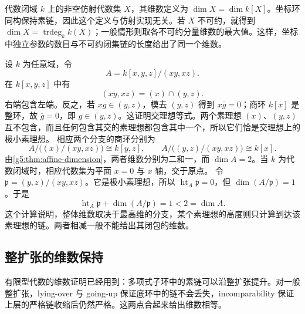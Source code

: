 代数闭域 \(k\) 上的非空仿射代数集 \(X\)，其维数定义为 \(\dim X=\dim k[X]\)。坐标环同构保持素链，因此这个定义与仿射实现无关。若 \(X\) 不可约，就得到 \(\dim X=\operatorname{trdeg}_k k(X)\)；一般情形则取各不可约分量维数的最大值。这样，坐标中独立参数的数目与不可约闭集链的长度给出了同一个维数。

\begin{example}\label{g5:exm:mixed-dimensional-components}
	设 \(k\) 为任意域，令
	\[
	A=k[x,y,z]/(xy,xz).
	\]
	在 \(k[x,y,z]\) 中有
	\[
	(xy,xz)=(x)\cap(y,z).
	\]
	右端包含左端。反之，若 \(xg\in(y,z)\)，模去 \((y,z)\) 得到 \(x\overline g=0\)；商环 \(k[x]\) 是整环，故 \(\overline g=0\)，即 \(g\in(y,z)\)。这证明交理想等式。两个素理想 \((x)\)、\((y,z)\) 互不包含，而且任何包含其交的素理想都包含其中一个，所以它们恰是交理想上的极小素理想。
	相应两个分支的商环分别为
	\[
	A/\bigl((x)/(xy,xz)\bigr)\cong k[y,z],
	\qquad
	A/\bigl((y,z)/(xy,xz)\bigr)\cong k[x].
	\]
	由\cref{g5:thm:affine-dimension}，两者维数分别为二和一，而 \(\dim A=2\)。当 \(k\) 为代数闭域时，相应代数集为平面 \(x=0\) 与 \(x\) 轴，交于原点。
	令 \(\mathfrak p=(y,z)/(xy,xz)\)。它是极小素理想，所以 \(\operatorname{ht}_A\mathfrak p=0\)，但 \(\dim(A/\mathfrak p)=1\)。于是
	\[
	\operatorname{ht}_A\mathfrak p+\dim(A/\mathfrak p)=1<2=\dim A.
	\]
	这个计算说明，整体维数取决于最高维的分支，某个素理想的高度则只计算到达该素理想的链。两者相减一般不能给出其闭包的维数。
\end{example}

\subsection{整扩张的维数保持}
\label{g5:subsec:0303:05}

有限型代数的维数证明已经用到：多项式子环中的素链可以沿整扩张提升。对一般整扩张，lying-over 与 going-up 保证底环中的链不会丢失，incomparability 保证上层的严格链收缩后仍然严格。这两点合起来给出维数相等。

